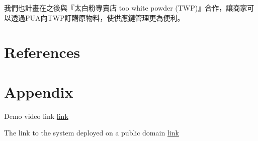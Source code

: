\documentclass[a4paper, 12pt]{article}
\begin{document}
我們也計畫在之後與『太白粉專賣店 too white powder (TWP)』合作，讓商家可以透過PUA向TWP訂購原物料，使供應鏈管理更為便利。

\newpage

\section{References}
\printbibliography[heading=none]
\newpage

\section{Appendix}
Demo video link \href{https://www.youtube.com/playlist?list=PLBGxrBkKAa3qo2uLVUKfLOQeE1iUDgnIc}{link} 

The link to the system deployed on a public domain \href{https://pua.noobdy.com}{link}
\newpage
\end{document}
